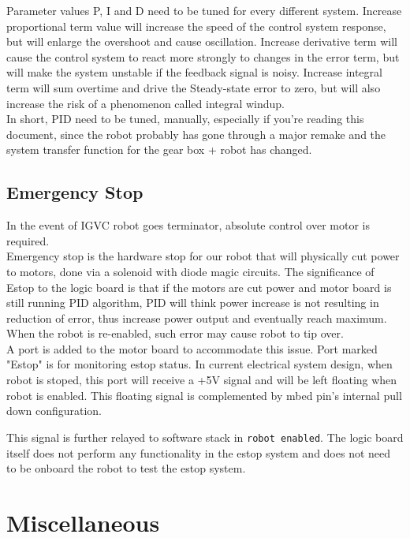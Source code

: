 \documentclass[letterpaper, 12pt]{article}
\begin{document}
Parameter values P, I and D need to be tuned for every different system. Increase proportional term value will increase the speed of the control system response, but will enlarge the overshoot and cause oscillation. Increase derivative term will cause the control system to react more strongly to changes in the error term, but will make the system unstable if the feedback signal is noisy. Increase integral term will sum overtime and drive the Steady-state error to zero, but will also increase the risk of a phenomenon called integral windup. \\

In short, PID need to be tuned, manually, especially if you're reading this document, since the robot probably has gone through a major remake and the system transfer function for the gear box + robot has changed.

\subsection{Emergency Stop}
In the event of IGVC robot goes terminator, absolute control over motor is required.\\

Emergency stop is the hardware stop for our robot that will physically cut power to motors,
done via a solenoid with diode magic circuits. The significance of Estop to the logic board
is that if the motors are cut power and motor board is still running PID algorithm, PID will
think power increase is not resulting in reduction of error, thus increase power output and
eventually reach maximum. When the robot is re-enabled, such error may cause robot to tip over. \\

A port is added to the motor board to accommodate this issue. Port marked "Estop" is for monitoring
estop status. In current electrical system design, when robot is stoped, this port will receive a +5V
signal and will be left floating when robot is enabled. This floating signal is complemented by mbed
pin's internal pull down configuration. 

This signal is further relayed to software stack in \texttt{robot enabled}. The logic board itself
does not perform any functionality in the estop system and does not need to be onboard the robot to test
the estop system.

\section{Miscellaneous}
\end{document}
